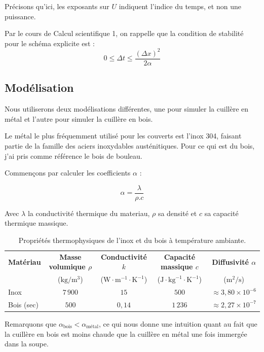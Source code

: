 \documentclass[11pt,a4paper]{article}
\begin{document}
Précisons qu'ici, les exposants sur $U$ indiquent l'indice du temps, et non une puissance.

Par le cours de Calcul scientifique 1, on rappelle que la condition de stabilité pour le schéma explicite est :
$$0 \le \Delta t \le \frac{(\Delta x)^2}{2 \alpha}$$

\subsection{Modélisation}

Nous utiliserons deux modélisations différentes, une pour simuler la cuillère en métal
et l'autre pour simuler la cuillère en bois.

Le métal le plus fréquemment utilisé pour les couverts est l'inox 304, faisant partie 
de la famille des aciers inoxydables austénitiques.
Pour ce qui est du bois, j'ai pris comme référence le bois de bouleau.

Commençons par calculer les coefficients $\alpha$ :

$$
\alpha = \frac{\lambda}{\rho . c}
$$

Avec $\lambda$ la conductivité thermique du materiau, $\rho$ sa densité
et $c$ sa capacité thermique massique.

\vspace{8mm}

\begin{table}[htbp]
  \centering
  \caption{Propriétés thermophysiques de l'inox et du bois à température ambiante.}
  \label{tab:proprietes_thermiques}
  \begin{tabular}{|l|c|c|c|c|}
    \hline
    \textbf{Matériau} & \textbf{Masse volumique $\rho$} & \textbf{Conductivité $k$} & \textbf{Capacité massique $c$} & \textbf{Diffusivité $\alpha$} \\
     & ($\text{kg}/\text{m}^3$) & ($\text{W}\cdot\text{m}^{-1}\cdot\text{K}^{-1}$) & ($\text{J}\cdot\text{kg}^{-1}\cdot\text{K}^{-1}$) & ($\text{m}^2/\text{s}$) \\
    \hline
    Inox & $7\,900$ & $15$ & $500$ & $\approx 3,80 \times 10^{-6}$ \\
    \hline
    Bois (sec) & $500$ & $0,14$ & $1\,236$ & $\approx 2,27 \times 10^{-7}$ \\
    \hline
  \end{tabular}
\end{table}

\vspace{10mm}

Remarquons que $\alpha_{\text{bois}} < \alpha_{\text{métal}}$, ce qui nous donne une intuition
quant au fait que la cuillère en bois est moins chaude que la cuillère en métal une fois immergée dans la soupe.
\end{document}
